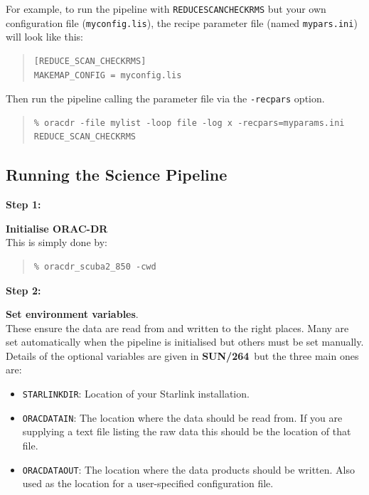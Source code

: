 \documentclass[twoside,11pt]{article}
\newcommand{\xref}[3]{#1}
\newcommand{\xlabel}[1]{}
\renewcommand{\_}{\texttt{\symbol{95}}}
\newenvironment{myquote}{\begin{quote}\begin{small}}{\end{small}\end{quote}}
\newcommand{\drrecipe}[1]{\texttt{#1}}
\newcommand{\param}[1]{\texttt{#1}}
\newcommand{\pipelinesun}{\xref{\textbf{SUN/264}}{sun264}{}}
\begin{document}
For example, to run the pipeline with \drrecipe{REDUCE\_SCAN\_CHECKRMS} but your
own configuration file (\texttt{myconfig.lis}), the recipe parameter file
(named \texttt{mypars.ini}) will look like this:
\vspace{0.2cm}
\begin{myquote}
\begin{verbatim}
[REDUCE_SCAN_CHECKRMS]
MAKEMAP_CONFIG = myconfig.lis
\end{verbatim}
\end{myquote}
\vspace{0.4cm}
Then run the pipeline calling the parameter file via the
\texttt{-recpars} option.
\begin{myquote}
\begin{verbatim}
% oracdr -file mylist -loop file -log x -recpars=myparams.ini REDUCE_SCAN_CHECKRMS
\end{verbatim}
\end{myquote}


\subsection{\xlabel{running_pl}Running the Science Pipeline}
\label{sec:plsteps}

\begin{minipage}[t]{0.15\linewidth}
\textbf{Step 1:}
\end{minipage}
\begin{minipage}[t]{0.85\linewidth}
\textbf{Initialise ORAC-DR} \\This is simply done by:
\begin{myquote}
\begin{verbatim}
% oracdr_scuba2_850 -cwd
\end{verbatim}
\end{myquote}
\end{minipage}

\begin{minipage}[t]{0.15\linewidth}
\textbf{Step 2:}
\end{minipage}
\begin{minipage}[t]{0.85\linewidth}
\textbf{Set environment variables}. \\These ensure the data are read
from and written to the right places. Many are set automatically when
the pipeline is initialised but others must be set manually. Details
of the optional variables are given in \pipelinesun\ but the three
main ones are:
\begin{itemize}\itemsep-0.1em
\item \param{STARLINK\_DIR}: Location of your Starlink installation.
\item \param{ORAC\_DATA\_IN}: The location where the data should be read from.
If you are supplying a text file listing the raw data this should be the
location of that file.
\item \param{ORAC\_DATA\_OUT}: The location where the data products should be
written. Also used as the location for a user-specified configuration file.\\
\end{itemize}
\end{minipage}
\end{document}
